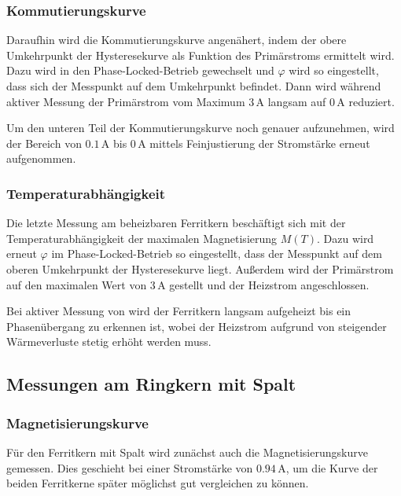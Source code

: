 \documentclass[12pt,a4paper]{scrartcl}
\numberwithin{equation}{section} %
\begin{document}
\hypertarget{kommutierungskurve}{%
\subsubsection{Kommutierungskurve}\label{kommutierungskurve}}
Daraufhin wird die Kommutierungskurve angenähert, indem der obere Umkehrpunkt der Hysteresekurve als Funktion des Primärstroms ermittelt wird. Dazu wird in den Phase-Locked-Betrieb gewechselt und $\varphi$ wird so eingestellt, dass sich der Messpunkt auf dem Umkehrpunkt befindet. Dann wird während aktiver Messung der Primärstrom vom Maximum $3\,\mathrm A$ langsam auf $0\,\mathrm A$ reduziert.

Um den unteren Teil der Kommutierungskurve noch genauer aufzunehmen, wird der Bereich von $0.1\,\mathrm A$ bis $0\,\mathrm A$ mittels Feinjustierung der Stromstärke erneut aufgenommen.

\hypertarget{temperaturabhuxe4ngigkeit}{%
\subsubsection{Temperaturabhängigkeit}\label{temperaturabhuxe4ngigkeit}}
Die letzte Messung am beheizbaren Ferritkern beschäftigt sich mit der Temperaturabhängigkeit der maximalen Magnetisierung $M(T)$. Dazu wird erneut $\varphi$ im Phase-Locked-Betrieb so eingestellt, dass der Messpunkt auf dem oberen Umkehrpunkt der Hysteresekurve liegt. Außerdem wird der Primärstrom auf den maximalen Wert von $3\,\mathrm A$ gestellt und der Heizstrom angeschlossen.

Bei aktiver Messung von wird der Ferritkern langsam aufgeheizt bis ein Phasenübergang zu erkennen ist, wobei der Heizstrom aufgrund von steigender Wärmeverluste stetig erhöht werden muss.

\hypertarget{messungen-am-ringkern-mit-spalt}{%
\subsection{Messungen am Ringkern mit Spalt}\label{messungen-am-ringkern-mit-spalt}}

\hypertarget{magnetisierungskurve-1}{%
\subsubsection{Magnetisierungskurve}\label{magnetisierungskurve-1}}

Für den Ferritkern mit Spalt wird zunächst auch die Magnetisierungskurve gemessen. Dies geschieht bei einer Stromstärke von $0.94\,\mathrm A$, um die Kurve der beiden Ferritkerne später möglichst gut vergleichen zu können.
\end{document}
